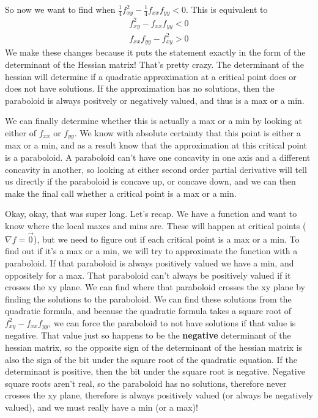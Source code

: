 \documentclass[12pt, letterpaper]{article}
\begin{document}
So now we want to find when $\frac{1}{4}f_{xy}^2 - \frac{1}{4}f_{xx}f_{yy} < 0$. This is equivalent to
\begin{gather*}
    f_{xy}^2 - f_{xx}f_{yy} < 0 \\
    f_{xx}f_{yy} - f_{xy}^2 > 0
\end{gather*}
We make these changes because it puts the statement exactly in the form of the determinant of the Hessian matrix! That's pretty crazy. The determinant of the hessian will determine if a quadratic approximation at a critical point does or does not have solutions. If the approximation has no solutions, then the paraboloid is always positvely or negatively valued, and thus is a max or a min.

We can finally determine whether this is actually a max or a min by looking at either of $f_{xx}$ or $f_{yy}$. We know with absolute certainty that this point is either a max or a min,
and as a result know that the approximation at this critical point is a paraboloid. A paraboloid can't have one concavity in one axis and a different concavity in another,
so looking at either second order partial derivative will tell us directly if the paraboloid is concave up, or concave down, and we can then make the final call whether a critical point is a max or a min.

Okay, okay, that was super long. Let's recap.
We have a function and want to know where the local maxes and mins are.
These will happen at critical points ($\nabla f = \vec{0}$), but we need to figure out if each critical point is a max or a min.
To find out if it's a max or a min, we will try to approximate the function with a paraboloid.
If that paraboloid is always positively valued we have a min, and oppositely for a max.
That paraboloid can't always be positively valued if it crosses the xy plane.
We can find where that paraboloid crosses the xy plane by finding the solutions to the paraboloid.
We can find these solutions from the quadratic formula, and because the quadratic formula takes a square root of $f_{xy}^2 - f_{xx}f_{yy}$, we can force the paraboloid to not have solutions if that value is negative.
That value just so happens to be the \textbf{negative} determinant of the hessian matrix, so the opposite sign of the determinant of the hessian matrix is also the sign of the bit under the square root of the quadratic equation.
If the determinant is positive, then the bit under the square root is negative.
Negative square roots aren't real, so the paraboloid has no solutions, therefore never crosses the xy plane, therefore is always positively valued (or always be negatively valued), and we must really have a min (or a max)!
\end{document}
